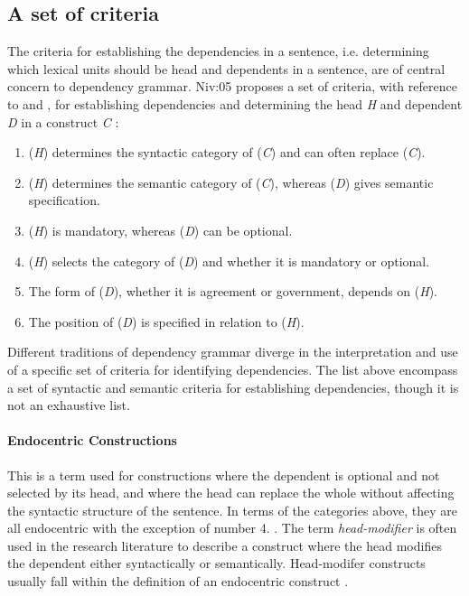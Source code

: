 \subsection{A set of criteria}
\label{criteria}

The criteria for establishing the dependencies in a sentence, i.e. determining which lexical units should be head and dependents in a sentence, are of central concern to dependency grammar. \citeauthor{}{Niv:05} proposes a set of criteria, with reference to \citeauthor{Zwicky:85} and \citeauthor{Hudson:90}, for establishing dependencies and determining the head \textit{H} and dependent \textit{D} in a construct \textit{C} \cite{Zwicky:85, Hudson:90, Niv:05}:

\begin{enumerate}
\item (\textit{H}) determines the syntactic category of (\textit{C}) and can often replace (\textit{C}).
\item (\textit{H}) determines the semantic category of (\textit{C}), whereas (\textit{D}) gives semantic specification.
\item (\textit{H}) is mandatory, whereas (\textit{D}) can be optional.
\item (\textit{H}) selects the category of (\textit{D}) and whether it is mandatory or optional.
\item The form of (\textit{D}), whether it is agreement or government, depends on (\textit{H}).
\item The position of (\textit{D}) is specified in relation to (\textit{H}).
\end{enumerate}

Different traditions of dependency grammar diverge in the interpretation and use of a specific set of criteria for identifying dependencies. The list above encompass a set of syntactic and semantic criteria for establishing dependencies, though it is not an exhaustive list. 

\paragraph{Endocentric Constructions} This is a term used for constructions where the dependent is optional and not selected by its head, and where the head can replace the whole without affecting the syntactic structure of the sentence. In terms of the categories above, they are all endocentric with the exception of number 4. \cite{KublerEtAl:09}. The term \textit{head-modifier} is often used in the research literature to describe a construct where the head modifies the dependent either syntactically or semantically. Head-modifer constructs usually fall within the definition of an endocentric construct \cite{Niv:05}.


